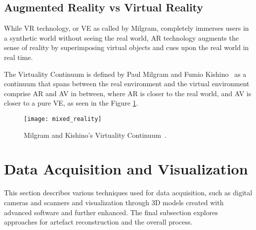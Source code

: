

\subsection{Augmented Reality vs Virtual Reality}
\label{sec:mix_reality}

While \gls{VR} technology, or \gls{VE} as called by Milgram, completely immerses users in a synthetic world
without seeing the real world, \gls{AR} technology augments the sense of reality by superimposing virtual objects and cues upon the real world in real time. 

The Virtuality Continuum is defined by Paul Milgram and Fumio Kishino~\cite{milgram1994taxonomy} as a continuum that spans between the real environment
and the virtual environment comprise \gls{AR} and \gls{AV}
in between, where \gls{AR} is closer to the real world, and \gls{AV} is closer to a pure \gls{VE}, as seen in the Figure \ref{fig:mixed_reality}.

\begin{figure}[htbp]
    \centering
    \texttt{[image: mixed\_reality]}
    \caption{Milgram and Kishino’s Virtuality Continuum~\cite{milgram1994taxonomy}.}
    \label{fig:mixed_reality} 
\end{figure} 
\FloatBarrier


\section{ Data Acquisition and Visualization}
\label{sec:data}

This section describes various techniques used for data acquisition, such as digital cameras and scanners and visualization through 3D models created with advanced software and further enhanced. 
The final subsection explores approaches for artefact reconstruction and the overall process.

